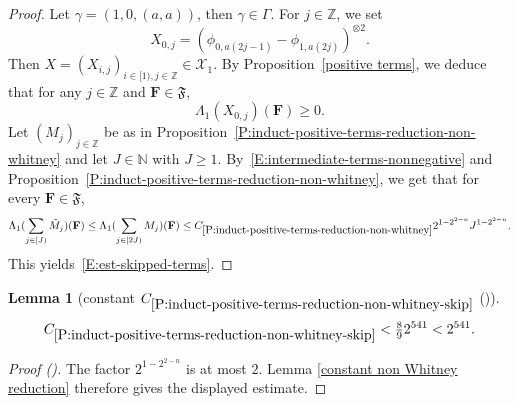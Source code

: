 \documentclass[12pt,reqno]{amsart}
\newcommand{\auto}{{({\tiny\faCar})}}
\theoremstyle{plain}
\newtheorem{lemma}[theorem]{Lemma}
\numberwithin{equation}{section}
\theoremstyle{remark}
\newcommand{\uses}[1]{}
\newcommand{\usesdefs}[1]{}
\newcommand{\Z}{{\mathbb Z}}
\newcommand{\N}{{\mathbb N}}
\begin{document}
\begin{proof}
Let $\gamma=(1,0,(a,a))$, then $\gamma \in \Gamma$. For $j\in \Z$, we set
\[
X_{0,j}=({\phi}_{0,a(2j-1)}-{\phi}_{1,a(2j)})^{\otimes 2}.
\]
Then $X=(X_{i,j})_{i\in [1),j\in \Z} \in \mathcal X_1$. By Proposition~\ref{positive terms}, we deduce that for any $j\in \Z$ and $\mathbf{F} \in \mathfrak{F}$,
\begin{equation}\label{E:intermediate-terms-nonnegative}
\Lambda_1(X_{0,j})(\mathbf{F}) \geq 0.
\end{equation}
Let $(M_j)_{j\in \Z}$ be as in Proposition~\ref{P:induct-positive-terms-reduction-non-whitney} and let $J\in\N$ with $J\ge1$. By~\eqref{E:intermediate-terms-nonnegative} and Proposition~\ref{P:induct-positive-terms-reduction-non-whitney}, we get that for every $\mathbf{F} \in \mathfrak{F}$,
\[
\Lambda_1(\sum_{j\in [J)} \tilde{M}_j)(\mathbf{F})
\leq \Lambda_1(\sum_{j\in [2J)} M_j)(\mathbf{F})
\leq C_{\ref{P:induct-positive-terms-reduction-non-whitney}} 2^{1-2^{2-n}} J^{1-2^{2-n}}.
\]
This yields~\eqref{E:est-skipped-terms}.
\end{proof}

\begin{lemma}[constant $C_{\ref{P:induct-positive-terms-reduction-non-whitney-skip}}$ \auto]\label{constant non Whitney skip reduction}\uses{constant non Whitney reduction,P:induct-positive-terms-reduction-non-whitney-skip}\usesdefs{}
\begin{equation}\label{constant non Whitney skip reduction bound}
C_{\ref{P:induct-positive-terms-reduction-non-whitney-skip}}
<\tfrac89 2^{541}<2^{541}.
\end{equation}
\end{lemma}
\begin{proof}[Proof \auto]
The factor $2^{1-2^{2-n}}$ is at most $2$. Lemma \ref{constant non Whitney reduction} therefore gives the displayed estimate.
\end{proof}
\end{document}
